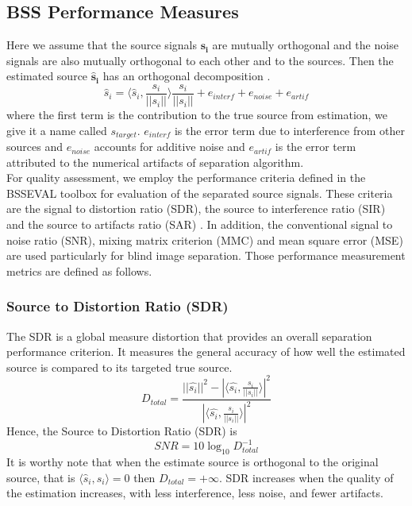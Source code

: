 \subsection{BSS Performance Measures}
\label{perform_metric}
Here we assume that the source signals $\mathbf{s_i}$ are mutually orthogonal and the noise signals are also mutually orthogonal to each other and to the sources. Then the estimated source $\mathbf{\hat{s}_i}$ has an orthogonal decomposition \cite{performanceMeasure}.
\begin{equation}
    \hat{s}_i = \big \langle \hat{s}_i,\frac{s_i}{||s_i||}\big \rangle\frac{s_i}{||s_i||} + e_{interf} + e_{noise} + e_{artif}
\end{equation}
where the first term is the contribution to the true source from estimation, we give it a name called $s_{target}$. $e_{interf}$ is the error term due to interference from other sources and $e_{noise}$ accounts for additive noise and $e_{artif}$ is the error term attributed to the numerical artifacts of separation algorithm. \\

For quality assessment, we employ the performance criteria defined in the BSSEVAL toolbox for evaluation of the separated source signals. These criteria are the signal to distortion ratio (SDR), the source to interference ratio (SIR) and the source to artifacts ratio (SAR) \cite{performanceMeasure}. In addition, the conventional signal to noise ratio (SNR), mixing matrix criterion (MMC) and mean square error (MSE) are used particularly for blind image separation. Those performance measurement metrics are defined as follows.

\subsubsection{Source to Distortion Ratio (SDR)}
The SDR is a global measure distortion that provides an overall separation performance criterion. It measures the general accuracy of how well the estimated source is compared to its targeted true source.
\begin{equation}
    D_{total} = \frac{||\hat{s_i}||^2 - |\big \langle \hat{s_i},\frac{s_i}{||s_i||}\big \rangle|^2} {|\big \langle \hat{s_i},\frac{s_i}{||s_i||}\big \rangle|^2}
\end{equation}
Hence, the Source to Distortion Ratio (SDR) is
\begin{equation}
    SNR = 10\log_{10} D^{-1}_{total}
\end{equation}
It is worthy note that when the estimate source is orthogonal to the original source, that is $\big \langle \hat{s}_i,s_i \big \rangle = 0$ then $D_{total} = +\infty $. SDR increases when the quality of the estimation increases, with
less interference, less noise, and fewer artifacts.
